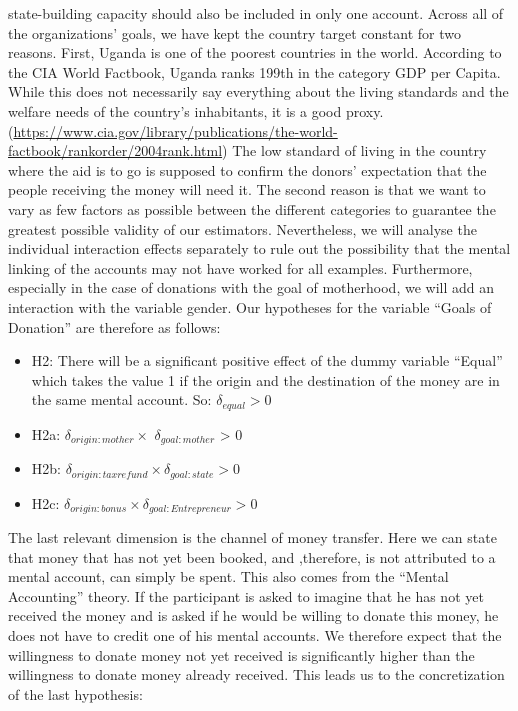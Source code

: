 \documentclass[
  12pt,
]{article}
\begin{document}
state-building capacity should also be included in only one account.
Across all of the organizations' goals, we have kept the country target
constant for two reasons. First, Uganda is one of the poorest countries
in the world. According to the CIA World Factbook, Uganda ranks 199th in
the category GDP per Capita. While this does not necessarily say
everything about the living standards and the welfare needs of the
country's inhabitants, it is a good proxy.
(\url{https://www.cia.gov/library/publications/the-world-factbook/rankorder/2004rank.html})
The low standard of living in the country where the aid is to go is
supposed to confirm the donors' expectation that the people receiving
the money will need it. The second reason is that we want to vary as few
factors as possible between the different categories to guarantee the
greatest possible validity of our estimators. Nevertheless, we will
analyse the individual interaction effects separately to rule out the
possibility that the mental linking of the accounts may not have worked
for all examples. Furthermore, especially in the case of donations with
the goal of motherhood, we will add an interaction with the variable
gender. Our hypotheses for the variable ``Goals of Donation'' are
therefore as follows:

\begin{itemize}
\item
  H2: There will be a significant positive effect of the dummy variable
  ``Equal'' which takes the value 1 if the origin and the destination of
  the money are in the same mental account. So: \(\delta_{equal} > 0\)
\item
  H2a: \(\delta_{origin:mother} \times\) \(\delta_{goal:mother}\)
  \textgreater{} 0
\item
  H2b: \(\delta_{origin:taxrefund} \times \delta_{goal:state} > 0\)
\item
  H2c: \(\delta_{origin:bonus} \times \delta_{goal:Entrepreneur} > 0\)
\end{itemize}

The last relevant dimension is the channel of money transfer. Here we
can state that money that has not yet been booked, and ,therefore, is
not attributed to a mental account, can simply be spent. This also comes
from the ``Mental Accounting'' theory. If the participant is asked to
imagine that he has not yet received the money and is asked if he would
be willing to donate this money, he does not have to credit one of his
mental accounts. We therefore expect that the willingness to donate
money not yet received is significantly higher than the willingness to
donate money already received. This leads us to the concretization of
the last hypothesis:
\end{document}

